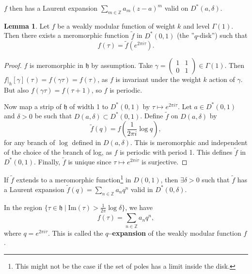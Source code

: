 \documentclass{article}
\theoremstyle{definition}
\newtheorem{lemma}[theorem]{Lemma}
\begin{document}
$f$ then has a Laurent expansion $\sum_{m \in \mathbb{Z}}^{} a_m (z-a)^{m}$ valid on $D^*(a,\delta)$.

\begin{lemma}
    Let $f$ be a weakly modular function of weight $k$ and level $\Gamma(1)$. Then there exists a meromorphic function $\tilde{f}$ in $D^*(0,1)$ (the ''$q$-disk'') such that $$f(\tau) = \tilde{f}(e^{2\pi i \tau}).$$
\end{lemma}
\begin{proof}
    $f$ is meromorphic in $\mathfrak{h}$ by assumption. Take $\gamma = \begin{pmatrix} 1 & 1 \\ 0 & 1 \end{pmatrix} \in \Gamma(1)$. Then $f|_h[\gamma](\tau) = f(\gamma \tau) = f(\tau)$, as $f$ is invariant under the weight $k$ action of $\gamma$. But also $f(\gamma \tau) = f(\tau+1)$, so $f$ is periodic. 
    \vspace{1mm}
     
    Now map a strip of $\mathfrak{h}$ of width 1 to $D^*(0,1)$ by $\tau \mapsto e^{2 \pi i \tau}$. Let $a \in D^*(0,1)$ and $\delta>0$ be such that $D(a,\delta) \subset D^*(0,1)$. Define $\tilde{f}$ on $D(a,\delta)$ by $$\tilde{f}(q) = f\left(\frac{1}{2\pi i} \log q\right),$$ for any branch of $\log$ defined in $D(a,\delta)$. This is meromorphic and independent of the choice of the branch of log, as $f$ is periodic with period 1. This defines $\tilde{f}$ in $D^*(0,1)$. Finally, $\tilde{f}$ is unique since $\tau \mapsto e^{2\pi i \tau}$ is surjective.
\end{proof}

If $\tilde{f}$ extends to a meromorphic function\footnote{This might not be the case if the set of poles has a limit inside the disk.} in $D(0,1)$, then $\exists \delta > 0$ such that $\tilde{f}$ has a Laurent expansion $\tilde{f}(q) = \sum_{n \in \mathbb{Z}}^{} a_n q^n$ valid in $D^*(0,\delta)$. 
\vspace{1mm}
 
In the region $\{\tau \in \mathfrak{h} \mid \text{Im}(\tau) > \frac{1}{2\pi} \log \delta\}$, we have $$f(\tau) = \sum_{n \in \mathbb{Z}}^{} a_nq^n,$$ where $q = e^{2\pi i \tau}$. This is called the \textbf{$q$--expansion} of the weakly modular function $f$.
\end{document}
